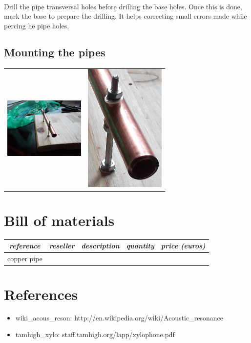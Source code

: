 \documentclass[12pt]{article}
\begin{document}
\paragraph{} Drill the pipe transversal holes before drilling the base holes. Once this is
done, mark the base to prepare the drilling. It helps correcting small errors made while
percing  he pipe holes.

\subsection{Mounting the pipes}
\begin{center}
  \begin{tabular}{c|c}
    \includegraphics[keepaspectratio=true, width=40mm]{../pics/assembly/mounted_pipe_scaled.jpg} &
    \includegraphics[keepaspectratio=true, width=40mm]{../pics/assembly/mounted_pipe_cropped.jpg}
  \end{tabular}
\end{center}

\newpage
\section{Bill of materials}
\begin{center}
  \begin{tabular}{|c|c|c|c|c|}
    \hline
    \textit{reference} &
    \textit{reseller} &
    \textit{description} &
    \textit{quantity} &
    \textit{price (euros)}\\
    \hline
    copper pipe\\
    \hline
  \end{tabular}
\end{center}

\newpage
\section{References}
\begin{itemize}
\item wiki\_acous\_reson: http://en.wikipedia.org/wiki/Acoustic\_resonance
\item tamhigh\_xylo: staff.tamhigh.org/lapp/xylophone.pdf
\end{itemize}
\end{document}
